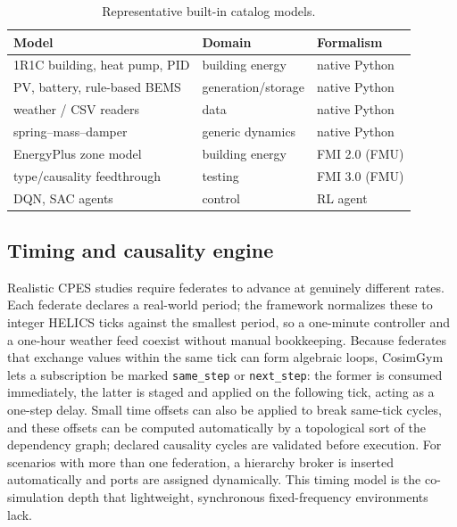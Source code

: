 \documentclass[preprint,12pt]{elsarticle}
\begin{document}
\begin{table}[t]\centering
\caption{Representative built-in catalog models.}
\label{tab:models}
\small
\begin{tabular}{@{}lll@{}}
\toprule
Model & Domain & Formalism \\
\midrule
1R1C building, heat pump, PID & building energy & native Python \\
PV, battery, rule-based BEMS   & generation/storage & native Python \\
weather / CSV readers          & data & native Python \\
spring--mass--damper           & generic dynamics & native Python \\
EnergyPlus zone model          & building energy & FMI 2.0 (FMU) \\
type/causality feedthrough     & testing & FMI 3.0 (FMU) \\
DQN, SAC agents                & control & RL agent \\
\bottomrule
\end{tabular}
\end{table}

\subsection{Timing and causality engine}
Realistic CPES studies require federates to advance at genuinely different rates.
Each federate declares a real-world period; the framework normalizes these to
integer HELICS ticks against the smallest period, so a one-minute controller and a
one-hour weather feed coexist without manual bookkeeping. Because federates that
exchange values within the same tick can form algebraic loops, CosimGym lets a
subscription be marked \texttt{same\_step} or \texttt{next\_step}: the former is
consumed immediately, the latter is staged and applied on the following tick,
acting as a one-step delay. Small time offsets can also be applied to break
same-tick cycles, and these offsets can be computed automatically by a topological
sort of the dependency graph; declared causality cycles are validated before
execution. For scenarios with more than one federation, a hierarchy broker is
inserted automatically and ports are assigned dynamically. This timing model is the
co-simulation depth that lightweight, synchronous fixed-frequency
environments~\cite{powergridworld} lack.
\end{document}
